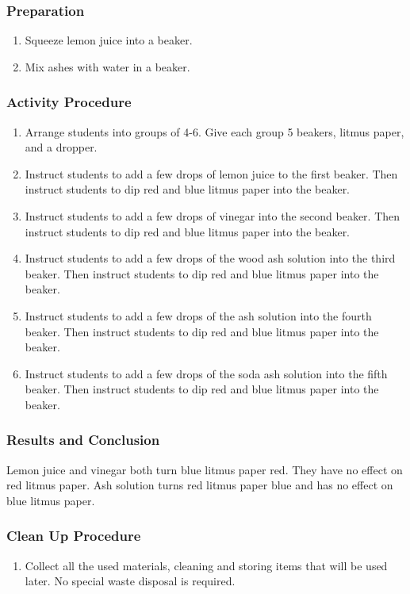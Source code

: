 \subsubsection*{Preparation}
\begin{enumerate}
\item{Squeeze lemon juice into a beaker.}
\item{Mix ashes with water in a beaker.}
\end{enumerate}

\subsubsection*{Activity Procedure}
\begin{enumerate}
\item{Arrange students into groups of 4-6.  Give each group 5 beakers, litmus paper, and a dropper.}
\item{Instruct students to add a few drops of lemon juice to the first beaker. Then instruct students to dip red and blue litmus paper into the beaker.}
\item{Instruct students to add a few drops of vinegar into the second beaker. Then instruct students to dip red and blue litmus paper into the beaker.}
\item{Instruct students to add a few drops of the wood ash solution into the third beaker. Then instruct students to dip red and blue litmus paper into the beaker.}
\item{Instruct students to add a few drops of the ash solution into the fourth beaker. Then instruct students to dip red and blue litmus paper into the beaker.}
\item{Instruct students to add a few drops of the soda ash solution into the fifth beaker. Then instruct students to dip red and blue litmus paper into the beaker.}
\end{enumerate}

\subsubsection*{Results and Conclusion}
Lemon juice and vinegar both turn blue litmus paper red. They have no effect on red litmus paper. Ash solution turns red litmus paper blue and has no effect on blue litmus paper.

\subsubsection*{Clean Up Procedure}
\begin{enumerate}
\item{Collect all the used materials, cleaning and storing items that will be used later.  No special waste disposal is required.}
\end{enumerate}

